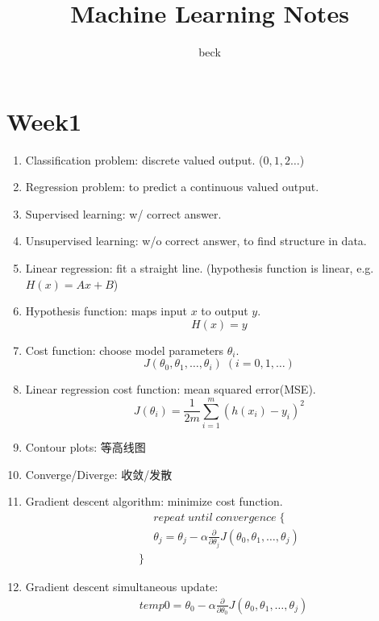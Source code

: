 \documentclass[UTF8]{ctexart}
\begin{document}
\title{Machine Learning Notes}
\author{beck}
\maketitle
\vfill
\clearpage
\section*{Week1}
\begin{enumerate}
    \item Classification problem: discrete valued output. ($0,1,2\ldots$)
    \item Regression problem: to predict a continuous valued output.
    \item Supervised learning: w/ correct answer.
    \item Unsupervised learning: w/o correct answer, to find structure in data.
    \item Linear regression: fit a straight line. (hypothesis function is linear, e.g.$H(x)=Ax+B$)
    \item Hypothesis function: maps input $x$ to output $y$.
          \[
              H(x) = y
          \]
    \item Cost function: choose model parameters $\theta_i$.
          \[
              J(\theta_0, \theta_1, \ldots, \theta_i)\; (i = 0, 1, \ldots)
          \]
    \item Linear regression cost function: mean squared error(MSE).
          \[
              J(\theta_i) = \frac{1}{2m} \sum_{i=1}^{m} (h(x_i) - y_i)^2
          \]
    \item Contour plots: 等高线图
    \item Converge/Diverge: 收敛/发散
    \item Gradient descent algorithm: minimize cost function.
          \[
              \begin{aligned}
                   & repeat\; until\; convergence\; \{                                                                      \\
                   & \theta_j = \theta_j - \alpha \frac{\partial}{\partial\theta_j} J(\theta_0, \theta_1, \ldots, \theta_j) \\
                  \}
              \end{aligned}
          \]
    \item Gradient descent simultaneous update:
          \[
              \begin{aligned}
                   & temp0 = \theta_0 - \alpha \frac{\partial}{\partial\theta_0} J(\theta_0, \theta_1, \ldots, \theta_j) \\

\end{aligned}\]
\end{enumerate}
\end{document}

